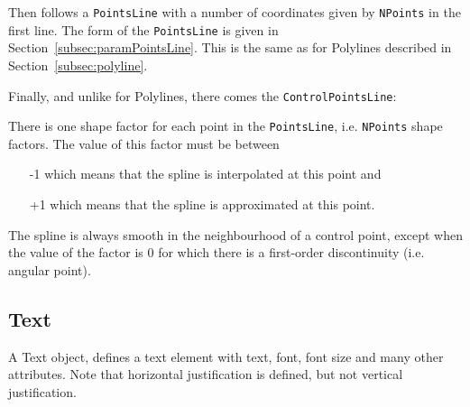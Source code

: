 \documentclass[10pt, a4paper]{article}
\begin{document}
Then follows a {\tt PointsLine} with a number of coordinates 
given by {\tt NPoints} in the first line. 
The form of the {\tt PointsLine} is given 
in Section~\ref{subsec:paramPointsLine}. 
This is the same as for Polylines described in Section~\ref{subsec:polyline}. 

Finally, and unlike for Polylines, there comes the {\tt ControlPointsLine}: 

There is one shape factor for each point in the {\tt PointsLine}, 
i.e. {\tt NPoints} shape factors. 
The value of this factor must be between 
%
\begin{itemize}
\item[-1] which means that the spline is interpolated at this point  and 
\item[+1] which means that the spline is approximated at this point. 
\end{itemize}
%
The spline is always smooth in the neighbourhood of a control point, 
except when the value of the factor is 0 
for which there is a first-order discontinuity (i.e. angular point).


\subsection{Text}\label{subsec:text}

A Text object, defines a text element 
with text, font, font size and many other attributes. 
Note that horizontal justification is defined, 
but not vertical justification. 
\end{document}

